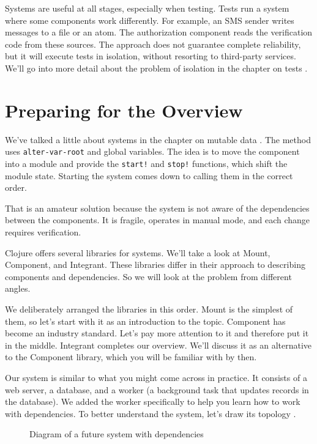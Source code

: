 Systems are useful at all stages, especially when testing. Tests run a system where some components work differently. For example, an SMS sender writes messages to a file or an atom. The authorization component reads the verification code from these sources. The approach does not guarantee complete reliability, but it will execute tests in isolation, without resorting to third-party services. We'll go into more detail about the problem of isolation in the chapter on tests .

\section{Preparing for the Overview}


We've talked a little about systems in the chapter on mutable data . The method uses \verb|alter-var-root| and global variables. The idea is to move the component into a module and provide the \verb|start!| and \verb|stop!| functions, which shift the module state. Starting the system comes down to calling them in the correct order.

That is an amateur solution because the system is not aware of the dependencies between the components. It is fragile, operates in manual mode, and each change requires verification.

Clojure offers several libraries for systems. We'll take a look at Mount, Component, and Integrant. These libraries differ in their approach to describing components and dependencies. So we will look at the problem from different angles.

We deliberately arranged the libraries in this order. Mount is the simplest of them, so let's start with it as an introduction to the topic. Component has become an industry standard. Let's pay more attention to it and therefore put it in the middle. Integrant completes our overview. We'll discuss it as an alternative to the Component library, which you will be familiar with by then.

Our system is similar to what you might come across in practice. It consists of a web server, a database, and a worker (a background task that updates records in the database). We added the worker specifically to help you learn how to work with dependencies. To better understand the system, let's draw its topology .

\begin{figure}[ht!]
  \caption{Diagram of a future system with dependencies}
  \label{fig:chart-system}
\end{figure}

